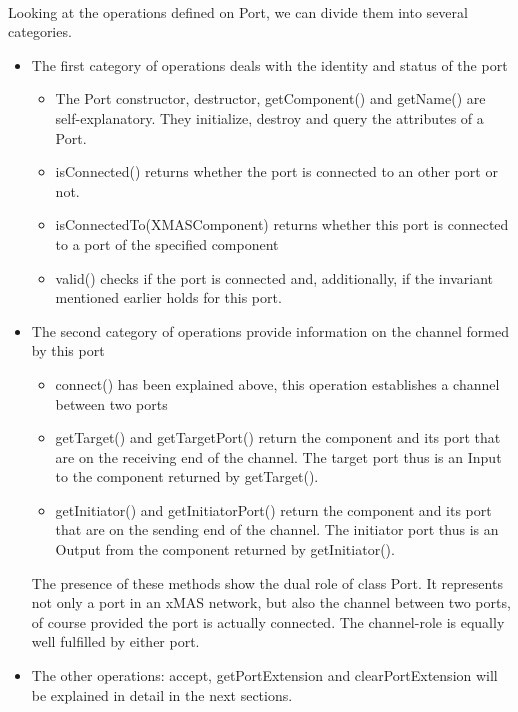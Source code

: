 \documentclass[a4paper,11pt]{article}
\begin{document}
\paragraph{}
Looking at the operations defined on Port, we can divide them into several categories.
\begin{itemize}
 \item The first category of operations deals with the identity and status of the port
 \begin{itemize}
  \item The Port constructor, destructor, getComponent() and getName() are self-explanatory. They initialize,
  destroy and query the attributes of a Port.
  \item isConnected() returns whether the port is connected to an other port or not.
  \item isConnectedTo(XMASComponent) returns whether this port is connected to a port of the specified component  
  \item valid() checks if the port is connected and, additionally, if the invariant mentioned earlier holds
  for this port.
 \end{itemize}
 
 \item The second category of operations provide information on the channel formed by this port
 \begin{itemize}
  \item connect() has been explained above, this operation establishes a channel between two ports
  \item getTarget() and getTargetPort() return the component and its port that are on the receiving end
  of the channel. The target port thus is an Input to the component returned by getTarget().
  \item getInitiator() and getInitiatorPort() return the component and its port that are on the sending end
  of the channel. The initiator port thus is an Output from the component returned by getInitiator().
 \end{itemize}
  The presence of these methods show the dual role of class Port. It represents not only a port in an
  xMAS network, but also the channel between two ports, of course provided the port is actually connected.
  The channel-role is equally well fulfilled by either port.
 \item The other operations: accept, getPortExtension and clearPortExtension will be explained in detail
 in the next sections.
\end{itemize}
\end{document}

